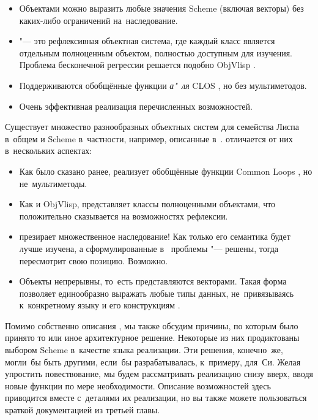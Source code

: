 \begin{itemize}
  \item Объектами {\Meroonet} можно выразить любые значения Scheme
        (включая векторы) без каких-либо ограничений на~наследование.

  \item {\Meroonet} "--- это рефлексивная объектная система, где каждый
        класс является отдельным полноценным объектом, полностью доступным
        для изучения. Проблема бесконечной регрессии решается подобно
        ObjVlisp \cite{coi87,bc87}.

  \item Поддерживаются обобщённые функции \emph{а"~ля} CLOS \cite{bdg+88},
        но без мультиметодов.

  \item Очень эффективная реализация перечисленных возможностей.
\end{itemize}

Существует множество разнообразных объектных систем для семейства Лиспа в~общем
и Scheme в~частности, например, описанные в~\cite{ar88,kes88,coi87,mnc+89,del89,
kdrb92}. {\Meroonet} отличается от них в~нескольких аспектах:

\begin{itemize}
  \item Как было сказано ранее, {\Meroonet} реализует обобщённые функции
        Common Loops \cite{bkk+86}, но не~мультиметоды.

  \item Как и ObjVlisp, {\Meroonet} представляет классы полноценными
        объектами, что положительно сказывается на возможностях рефлексии.

  \item {}
        {\Meroonet} презирает множественное наследование! Как только его
        семантика будет лучше изучена, а сформулированные в~\cite{dhhm92}
        проблемы "--- решены, тогда {\Meroonet} пересмотрит свою позицию.
        Возможно.

  \item Объекты {\Meroonet} непрерывны, то~есть представляются векторами.
        Такая форма позволяет единообразно выражать любые типы данных,
        не~привязываясь к~конкретному языку и его конструкциям
        \cite{qc88,que95,que90a}.
\end{itemize}

Помимо собственно описания {\Meroonet}, мы также обсудим причины, по которым
было принято то или иное архитектурное решение. Некоторые из них продиктованы
выбором Scheme в~качестве языка реализации. Эти решения, конечно~же, могли~бы
быть другими, если~бы {\Meroonet} разрабатывалась, к~примеру, для~Си. Желая
упростить повествование, мы будем рассматривать реализацию снизу вверх, вводя
новые функции по мере необходимости. Описание возможностей {\Meroonet} здесь
приводится вместе с~деталями их реализации, но вы также можете пользоваться
краткой документацией из третьей главы. 


